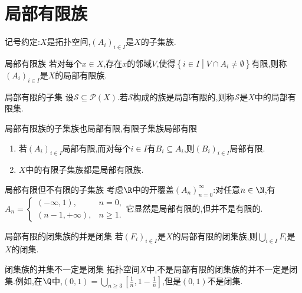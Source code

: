 \section{局部有限族}

记号约定:$X$是拓扑空间,$\left(A_{i}\right)_{i\in I}$是$X$的子集族.

\begin{definition}{局部有限族}{}
	若对每个$x\in X$,存在$x$的邻域$V$,使得$\left\{i\in I\middle|V\cap A_{i}\neq\emptyset\right\}$有限,则称$\left(A_{i}\right)_{i\in I}$是$X$的局部有限族.
\end{definition}

\begin{definition}{局部有限的子集}{}
	设$\mathcal{S}\subseteq\mathcal{P}\left(X\right)$.若$\mathcal{S}$构成的族是局部有限的,则称$\mathcal{S}$是$X$中的局部有限集.
\end{definition}

\begin{proposition}{局部有限族的子集族也局部有限,有限子集族局部有限}{}
	\begin{enumerate}
		\item 若$\left(A_{i}\right)_{i\in I}$局部有限,而对每个$i\in I$有$B_{i}\subseteq A_{i}$,则$\left(B_{i}\right)_{i\in I}$局部有限.
		\item $X$中的有限子集族都是局部有限族.
	\end{enumerate}
\end{proposition}

\begin{example}{局部有限但不有限的子集族}{}
	考虑$\R$中的开覆盖$\left(A_{n}\right)_{n=0}^{\infty}$:对任意$n\in\N$,有$A_{n}=
	\begin{cases}
		\left(-\infty,1\right),&n=0,\\
		\left(n-1,+\infty\right),&n\geq 1.
	\end{cases}$它显然是局部有限的,但并不是有限的.
\end{example}

\begin{proposition}{局部有限的闭集族的并是闭集}{}
	若$\left(F_{i}\right)_{i\in I}$是$X$的局部有限的闭集族,则$\bigcup\limits_{i\in I}F_{i}$是$X$的闭集.
\end{proposition}

\begin{example}{闭集族的并集不一定是闭集}{}
	拓扑空间$X$中,不是局部有限的闭集族的并不一定是闭集.例如,在$\Q$中,$\left(0,1\right)=\bigcup\limits_{n\geq 3}\left[\frac{1}{n},1-\frac{1}{n}\right]$,但是$\left(0,1\right)$不是闭集.
\end{example}